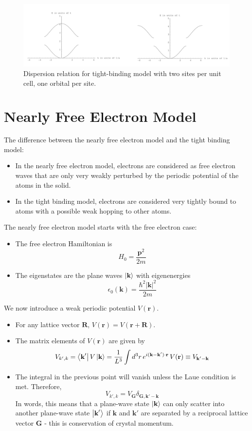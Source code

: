 \documentclass[10pt]{article}
\begin{document}
\begin{figure}
  \centering
    \includegraphics[width=\textwidth]{tb5}
    \caption{Dispersion relation for tight-binding model with two sites per unit cell, one orbital per site.}
\end{figure}

\section{Nearly Free Electron Model}
The difference between the nearly free electron model and the tight binding model:
\begin{itemize}
  \item In the nearly free electron model, electrons are considered as free electron waves that are only very
  weakly perturbed by the periodic potential of the atoms in the solid.
  \item In the tight binding model, electrons are considered very tightly bound to atoms with a possible weak
  hopping to other atoms.
\end{itemize}
The nearly free electron model starts with the free electron case:
\begin{itemize}
  \item The free electron Hamiltonian is
  $$
     H_{0} = \frac{\textbf{p}^{2}}{2m}
  $$
  \item The eigenstates are the plane waves $\ket{\textbf{k}}$ with
  eigenenergies
  $$
    \epsilon_{0}(\textbf{k}) = \frac{\hbar^{2}|\textbf{k}|^{2}}{2m}
  $$
\end{itemize}
We now introduce a weak periodic potential $V(\textbf{r})$.
\begin{itemize}
  \item For any lattice vector $\textbf{R}$, $V(\textbf{r}) = V(\textbf{r} + \textbf{R})$.
  \item The matrix elements of $V(\textbf{r})$ are given by
  $$
    V_{k',k} = \bra{\textbf{k}'}V\ket{\textbf{k}} = \frac{1}{L^{3}}\int d^{3}r \,e^{i(\textbf{k} - \textbf{k}')\cdot \textbf{r}}\,V(\textbf{r})
    \equiv V_{\textbf{k}' - \textbf{k}}
  $$
  \item The integral in the previous point will vanish unless the Laue condition is met. Therefore,
  $$
    V_{k',k} =V_{\textbf{G}}\delta_{\textbf{G}, \textbf{k}' - \textbf{k}}
  $$
  In words, this means that a plane-wave state $\ket{\textbf{k}}$ can only scatter into another
  plane-wave state $\ket{\textbf{k}'}$ if $\textbf{k}$ and $\textbf{k}'$ are separated by a
  reciprocal lattice vector $\textbf{G}$ - this is conservation of crystal momentum.
\end{itemize}
\end{document}
